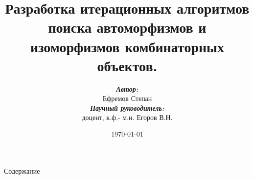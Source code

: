 \documentclass{beamer}
\begin{document}
\title{Разработка итерационных алгоритмов поиска автоморфизмов
и изоморфизмов комбинаторных объектов.}


\author{\textit{\bfseries Автор:}\\ Ефремов Степан\\ \textit{\bfseries Научный руководитель:}\\ доцент, к.ф.- м.н. Егоров В.Н.}

\date{\today} 


\begin{frame}{}
\titlepage
\end{frame}


\begin{frame}{Содержание}
\tableofcontents
\end{frame} 
\end{document}
